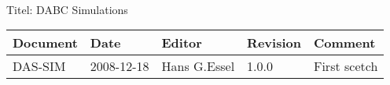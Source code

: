 \\Titel: DABC Simulations
\begin{table}[h]
\begin{tabular}{|p{2.8cm}|p{2.0cm}|p{3.0cm}|p{1.6cm}|p{5.0cm}|} \hline
Document   & Date        & Editor       & Revision & Comment \\ \hline
DAS-SIM & 2008-12-18 & Hans G.Essel & 1.0.0      & First scetch \\ \hline
\end{tabular}
\end{table}
